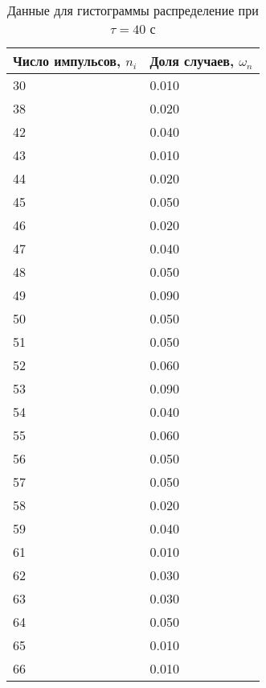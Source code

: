 \documentclass[a4paper]{article}
\begin{document}
\begin{table}[!h]
\begin{center}
\begin{tabular}{|l|l|}
\hline
Число импульсов, $n_{i}$ & Доля случаев, $\omega_{n}$ \\\hline
30                       & 0.010                       \\\hline
38                       & 0.020                       \\\hline
42                       & 0.040                       \\\hline
43                       & 0.010                       \\\hline
44                       & 0.020                       \\\hline
45                       & 0.050                      \\\hline
46                       & 0.020                      \\\hline
47                       & 0.040                      \\\hline
48                       & 0.050                      \\\hline
49                       & 0.090                      \\\hline
50                       & 0.050                      \\\hline
51                       & 0.050                      \\\hline
52                       & 0.060                      \\\hline
53                       & 0.090                      \\\hline
54                       & 0.040                      \\\hline
55                       & 0.060                     \\\hline
56                       & 0.050                      \\\hline
57                       & 0.050                      \\\hline
58                       & 0.020                      \\\hline
59                       & 0.040                      \\\hline
61                       & 0.010                      \\\hline
62                       & 0.030                      \\\hline
63                       & 0.030                      \\\hline
64                       & 0.050                      \\\hline
65                       & 0.010                      \\\hline
66                       & 0.010                      \\\hline
\end{tabular}
\caption{Данные для гистограммы распределение при $\tau = 40$ с}
\end{center}
\end{table}
\end{document}
